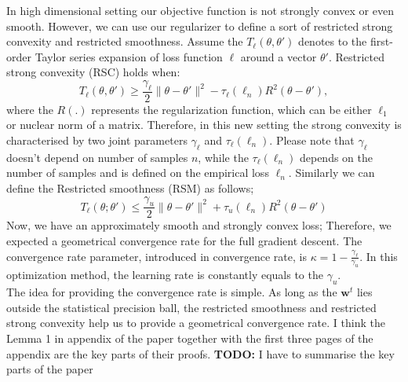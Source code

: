 \documentclass[11pt, a4paper, reqno, twoside]{scrartcl}
\theoremstyle{style}
\newcommand{\wv}{\bm{w}}
\newcommand{\0}{\mathbf{0}} %
\newcommand{\todo}[1]{\marginpar[\hspace*{4.5em}\textbf{TODO}\hspace*{-4.5em}]{\textbf{TODO}}\textbf{TODO:} #1}
\begin{document}
In high dimensional setting our objective function is not strongly convex or
even smooth. However, we can use our regularizer to define a sort of restricted
strong convexity and restricted smoothness. Assume the
$T_{\ell}(\theta,\theta')$ denotes to the first-order Taylor series expansion
of loss function $\ell$ around a vector $\theta'$.
Restricted strong convexity (RSC) holds when: 
\begin{equation}
	T_{\ell}(\theta,\theta') \geq \frac{\gamma_{\ell}}{2} \| \theta - \theta'
	\|^2 - \tau_{\ell}(\ell_n) R^2(\theta-\theta'),
\end{equation}
where the $R(.)$ represents the regularization function, which can be either
$\ell_1	$ or nuclear norm of a matrix. Therefore, in this new setting the
strong convexity is characterised by two joint parameters $\gamma_{\ell}$ and
$\tau_{\ell}(\ell_n)$. Please note that $\gamma_{\ell}$ doesn't depend on number of
samples $n$, while the $\tau_{\ell}(\ell_n)$ depends on the number of samples and is
defined on the empirical loss $\ell_n$. Similarly we can define the Restricted
smoothness (RSM) as follows; 
\begin{equation}
T_{\ell}(\theta;\theta') \leq \frac{\gamma_u}{2} \| \theta - \theta' \|^2 +
\tau_{u}(\ell_n) R^2(\theta-\theta')
\end{equation}
Now, we have an approximately smooth and strongly convex loss; Therefore, we
expected a geometrical convergence rate for the full gradient descent. The
convergence rate parameter, introduced in convergence rate, is $\kappa = 1-
\frac{\gamma_{\ell}}{\gamma_u}$. In this optimization method, the learning rate
is constantly equals to the $\gamma_u$.\\
The idea for providing the convergence rate is simple. As long as the $\wv^t$
lies outside the statistical precision ball, the restricted smoothness and
restricted strong convexity help us to provide a geometrical convergence rate. I
think the Lemma 1 in appendix of the paper together with the first three pages
of the appendix are the key parts of their proofs.
\todo{I have to summarise the key parts of the paper}
\end{document}
